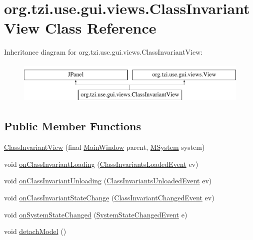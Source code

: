 \hypertarget{classorg_1_1tzi_1_1use_1_1gui_1_1views_1_1_class_invariant_view}{\section{org.\-tzi.\-use.\-gui.\-views.\-Class\-Invariant\-View Class Reference}
\label{classorg_1_1tzi_1_1use_1_1gui_1_1views_1_1_class_invariant_view}
}
Inheritance diagram for org.\-tzi.\-use.\-gui.\-views.\-Class\-Invariant\-View\-:\begin{figure}[H]
\begin{center}
\leavevmode
\includegraphics[height=2.000000cm]{classorg_1_1tzi_1_1use_1_1gui_1_1views_1_1_class_invariant_view}
\end{center}
\end{figure}
\subsection*{Public Member Functions}
\begin{DoxyCompactItemize}
\item 
\hyperlink{classorg_1_1tzi_1_1use_1_1gui_1_1views_1_1_class_invariant_view_a78c97f2681f48fde7506e6474b6ac1d4}{Class\-Invariant\-View} (final \hyperlink{classorg_1_1tzi_1_1use_1_1gui_1_1main_1_1_main_window}{Main\-Window} parent, \hyperlink{classorg_1_1tzi_1_1use_1_1uml_1_1sys_1_1_m_system}{M\-System} system)
\item 
void \hyperlink{classorg_1_1tzi_1_1use_1_1gui_1_1views_1_1_class_invariant_view_af78378789d8aae752ab97d9529cbd602}{on\-Class\-Invariant\-Loading} (\hyperlink{classorg_1_1tzi_1_1use_1_1uml_1_1sys_1_1events_1_1_class_invariants_loaded_event}{Class\-Invariants\-Loaded\-Event} ev)
\item 
void \hyperlink{classorg_1_1tzi_1_1use_1_1gui_1_1views_1_1_class_invariant_view_ae506e94651ec02429bd1e7f0f6aaa4ed}{on\-Class\-Invariant\-Unloading} (\hyperlink{classorg_1_1tzi_1_1use_1_1uml_1_1sys_1_1events_1_1_class_invariants_unloaded_event}{Class\-Invariants\-Unloaded\-Event} ev)
\item 
void \hyperlink{classorg_1_1tzi_1_1use_1_1gui_1_1views_1_1_class_invariant_view_a27d35112bcf54479d2ed81ddafc1548d}{on\-Class\-Invariant\-State\-Change} (\hyperlink{classorg_1_1tzi_1_1use_1_1uml_1_1sys_1_1events_1_1_class_invariant_changed_event}{Class\-Invariant\-Changed\-Event} ev)
\item 
void \hyperlink{classorg_1_1tzi_1_1use_1_1gui_1_1views_1_1_class_invariant_view_a99b57cdab97071087b24f795d2c1c5ab}{on\-System\-State\-Changed} (\hyperlink{interfaceorg_1_1tzi_1_1use_1_1uml_1_1sys_1_1events_1_1tags_1_1_system_state_changed_event}{System\-State\-Changed\-Event} e)
\item 
void \hyperlink{classorg_1_1tzi_1_1use_1_1gui_1_1views_1_1_class_invariant_view_ad8491fdf5cceaddcc58afd276f74f108}{detach\-Model} ()
\end{DoxyCompactItemize}


